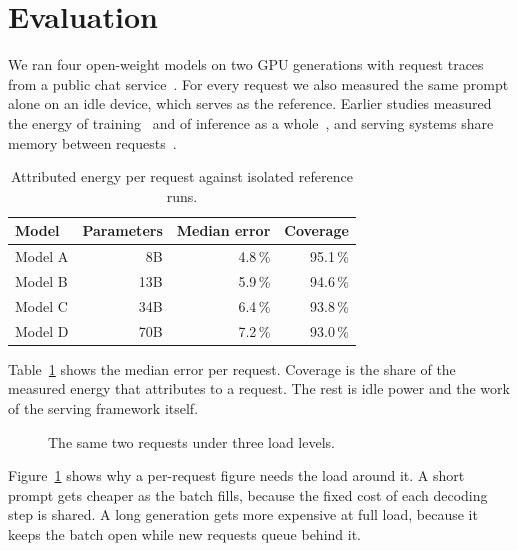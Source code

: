 \section{Evaluation}\label{sec:eval}

We ran four open-weight models on two GPU generations with request traces from a public chat service~\cite{haddadin2025traces}.
For every request we also measured the same prompt alone on an idle device, which serves as the reference.
Earlier studies measured the energy of training~\cite{strubell2019energy,patterson2021carbon,luccioni2023bloom} and of inference as a whole~\cite{samsi2023words}, and serving systems share memory between requests~\cite{kwon2023paged}.

\begin{table}[t]
  \caption{Attributed energy per request against isolated reference runs.}
  \label{tab:results}
  \begin{tabular}{lrrr}
    \toprule
    Model & Parameters & Median error & Coverage \\
    \midrule
    Model A & 8B  & 4.8\,\% & 95.1\,\% \\
    Model B & 13B & 5.9\,\% & 94.6\,\% \\
    Model C & 34B & 6.4\,\% & 93.8\,\% \\
    Model D & 70B & 7.2\,\% & 93.0\,\% \\
    \bottomrule
  \end{tabular}
\end{table}

Table~\ref{tab:results} shows the median error per request.
Coverage is the share of the measured energy that \sysname{} attributes to a request.
The rest is idle power and the work of the serving framework itself.

\begin{figure}[t]
  \caption{The same two requests under three load levels.}
  \label{fig:load}
\end{figure}

Figure~\ref{fig:load} shows why a per-request figure needs the load around it.
A short prompt gets cheaper as the batch fills, because the fixed cost of each decoding step is shared.
A long generation gets more expensive at full load, because it keeps the batch open while new requests queue behind it.
